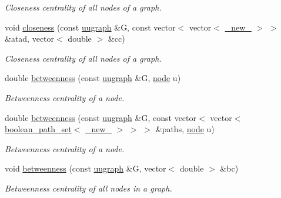 \begin{DoxyCompactItemize}
\begin{DoxyCompactList}\small\item\em Closeness centrality of all nodes of a graph. \end{DoxyCompactList}\item 
void \hyperlink{namespacelgraph_1_1networks_1_1metrics_1_1centralities_a9774afdefe5a503baa5c600ae8e903c2}{closeness} (const \hyperlink{classlgraph_1_1utils_1_1uugraph}{uugraph} \&G, const vector$<$ vector$<$ \hyperlink{namespacelgraph_1_1utils_a2c84bfde888c42ab3ad6b2cb8a364240}{\+\_\+new\+\_\+} $>$ $>$ \&atad, vector$<$ double $>$ \&cc)
\begin{DoxyCompactList}\small\item\em Closeness centrality of all nodes of a graph. \end{DoxyCompactList}\item 
double \hyperlink{namespacelgraph_1_1networks_1_1metrics_1_1centralities_aa4f1bdbafd5df2de345a6bd7976b4b2f}{betweenness} (const \hyperlink{classlgraph_1_1utils_1_1uugraph}{uugraph} \&G, \hyperlink{namespacelgraph_1_1utils_a7bd66ede3805ef121bc2835bd48de0cf}{node} u)
\begin{DoxyCompactList}\small\item\em Betweenness centrality of a node. \end{DoxyCompactList}\item 
double \hyperlink{namespacelgraph_1_1networks_1_1metrics_1_1centralities_ab0bbeb70e403b5d262debf80f8d93dc1}{betweenness} (const \hyperlink{classlgraph_1_1utils_1_1uugraph}{uugraph} \&G, const vector$<$ vector$<$ \hyperlink{namespacelgraph_1_1utils_aaf50131e15d771a45620336d6e7a77f8}{boolean\+\_\+path\+\_\+set}$<$ \hyperlink{namespacelgraph_1_1utils_a2c84bfde888c42ab3ad6b2cb8a364240}{\+\_\+new\+\_\+} $>$ $>$ $>$ \&paths, \hyperlink{namespacelgraph_1_1utils_a7bd66ede3805ef121bc2835bd48de0cf}{node} u)
\begin{DoxyCompactList}\small\item\em Betweenness centrality of a node. \end{DoxyCompactList}\item 
void \hyperlink{namespacelgraph_1_1networks_1_1metrics_1_1centralities_ad5f8fafeefd9a4cdb6ba5da8c33f9b69}{betweenness} (const \hyperlink{classlgraph_1_1utils_1_1uugraph}{uugraph} \&G, vector$<$ double $>$ \&bc)
\begin{DoxyCompactList}\small\item\em Betweenness centrality of all nodes in a graph. \end{DoxyCompactList}\item 

\end{DoxyCompactItemize}
